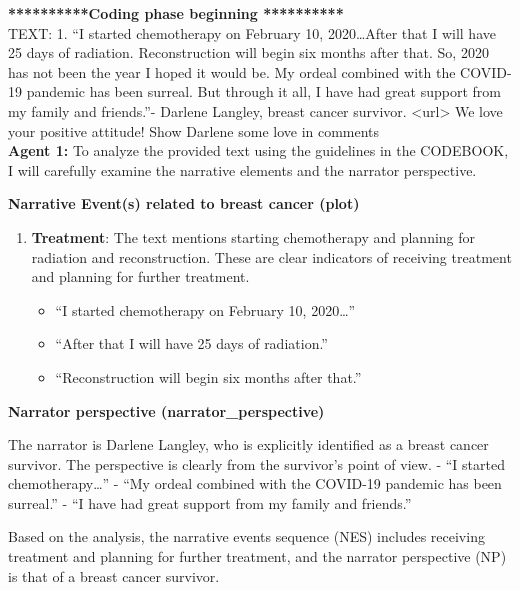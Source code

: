 \textbf{**********Coding phase beginning **********}\\

TEXT: 1. ``I started chemotherapy on February 10, 2020\ldots After that
I will have 25 days of radiation. Reconstruction will begin six months
after that. So, 2020 has not been the year I hoped it would be. My
ordeal combined with the COVID-19 pandemic has been surreal. But through
it all, I have had great support from my family and friends.''- Darlene
Langley, breast cancer survivor. <url> We love your positive attitude! Show Darlene some love in comments\\

\textbf{Agent 1:} To analyze the provided text using the guidelines in the
CODEBOOK, I will carefully examine the narrative elements and the
narrator perspective.

\textbf{Narrative Event(s) related to breast cancer
(plot)}

\begin{enumerate}
\def\labelenumi{\arabic{enumi}.}
\tightlist
\item
  \textbf{Treatment}: The text mentions starting chemotherapy and
  planning for radiation and reconstruction. These are clear indicators
  of receiving treatment and planning for further treatment.

  \begin{itemize}
  \tightlist
  \item
    ``I started chemotherapy on February 10, 2020\ldots{}''
  \item
    ``After that I will have 25 days of radiation.''
  \item
    ``Reconstruction will begin six months after that.''
  \end{itemize}
\end{enumerate}

\textbf{Narrator perspective
(narrator\_perspective)}

The narrator is Darlene Langley, who is explicitly identified as a
breast cancer survivor. The perspective is clearly from the survivor's
point of view. - ``I started chemotherapy\ldots{}'' - ``My ordeal
combined with the COVID-19 pandemic has been surreal.'' - ``I have had
great support from my family and friends.''

Based on the analysis, the narrative events sequence (NES) includes
receiving treatment and planning for further treatment, and the narrator
perspective (NP) is that of a breast cancer survivor.

